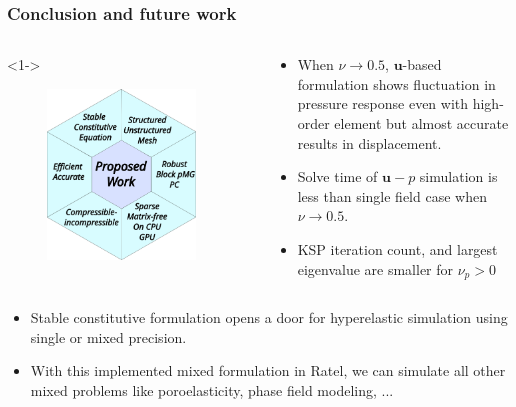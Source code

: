 \documentclass{beamer}
\newcommand{\bm}{\boldsymbol}
\begin{document}
\begin{frame}
	\frametitle{Conclusion and future work}
	\begin{columns}
		\begin{column}{0.5\textwidth}<1->
			\begin{figure}
				\center\includegraphics[angle=0,width=0.9\textwidth]{../figs/summary.png}
			\end{figure}
		\end{column}
		\begin{column}{0.5\textwidth}
			\begin{itemize}
				\item<2-> \small{When $\nu \to 0.5$, $\bm u$-based formulation shows fluctuation in pressure response even with high-order element but almost accurate results in displacement.}
				\item<3-> \small{Solve time of $\bm u - p$ simulation is less than single field case when $\nu \to 0.5$.}
				\item<4-> \small{KSP iteration count, and largest eigenvalue are smaller for $\nu_p > 0$}
			\end{itemize}
		\end{column}
	\end{columns}

	\small{
	\begin{itemize}
		\item<5-> Stable constitutive formulation opens a door for hyperelastic simulation using single or mixed precision.
		\item<6-> With this implemented mixed formulation in Ratel, we can simulate all other mixed problems like poroelasticity, phase field modeling, ...
	\end{itemize}}
\end{frame}
\end{document}
